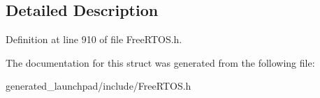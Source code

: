 \subsection{Detailed Description}


Definition at line 910 of file Free\+R\+T\+O\+S.\+h.



The documentation for this struct was generated from the following file\+:\begin{DoxyCompactItemize}
\item 
generated\+\_\+launchpad/include/Free\+R\+T\+O\+S.\+h\end{DoxyCompactItemize}
